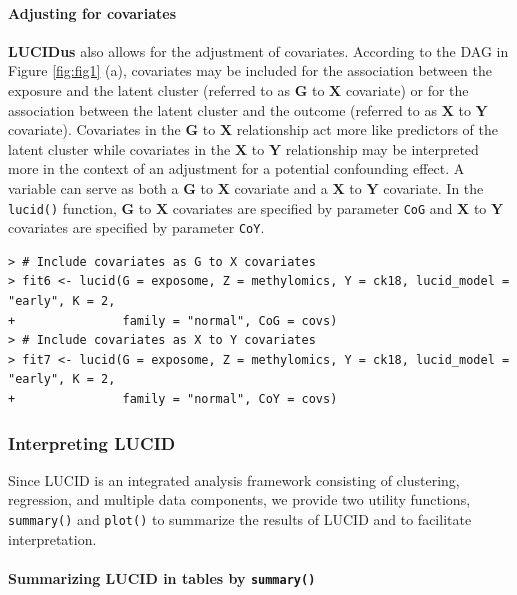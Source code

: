 \paragraph{Adjusting for covariates}\label{sec3.1.3}

\textbf{LUCIDus} also allows for the adjustment of covariates. According to
the DAG in Figure \ref{fig:fig1} (a), covariates may be included for
the association between the exposure and the latent cluster (referred to
as \(\boldsymbol{\mathbf{G}}\) to \(\boldsymbol{\mathbf{X}}\) covariate) or
for the association between the latent cluster and the outcome (referred
to as \(\boldsymbol{\mathbf{X}}\) to \(\boldsymbol{\mathbf{Y}}\) covariate).
Covariates in the \(\boldsymbol{\mathbf{G}}\) to \(\boldsymbol{\mathbf{X}}\)
relationship act more like predictors of the latent cluster while
covariates in the \(\boldsymbol{\mathbf{X}}\) to \(\boldsymbol{\mathbf{Y}}\)
relationship may be interpreted more in the context of an adjustment for
a potential confounding effect. A variable can serve as both a
\(\boldsymbol{\mathbf{G}}\) to \(\boldsymbol{\mathbf{X}}\) covariate and a
\(\boldsymbol{\mathbf{X}}\) to \(\boldsymbol{\mathbf{Y}}\) covariate. In the
\texttt{lucid()} function, \(\boldsymbol{\mathbf{G}}\) to
\(\boldsymbol{\mathbf{X}}\) covariates are specified by parameter \texttt{CoG}
and \(\boldsymbol{\mathbf{X}}\) to \(\boldsymbol{\mathbf{Y}}\) covariates
are specified by parameter \texttt{CoY}.

\begin{verbatim}
> # Include covariates as G to X covariates
> fit6 <- lucid(G = exposome, Z = methylomics, Y = ck18, lucid_model = "early", K = 2, 
+               family = "normal", CoG = covs)
> # Include covariates as X to Y covariates
> fit7 <- lucid(G = exposome, Z = methylomics, Y = ck18, lucid_model = "early", K = 2, 
+               family = "normal", CoY = covs)
\end{verbatim}

\subsubsection{Interpreting LUCID}\label{section3.2}

Since LUCID is an integrated analysis framework consisting of
clustering, regression, and multiple data components, we provide two
utility functions, \texttt{summary()} and \texttt{plot()} to summarize the results of
LUCID and to facilitate interpretation.

\paragraph{\texorpdfstring{Summarizing LUCID in tables by \texttt{summary()}}{Summarizing LUCID in tables by summary()}}\label{summarizing-lucid-in-tables-by-summary}

